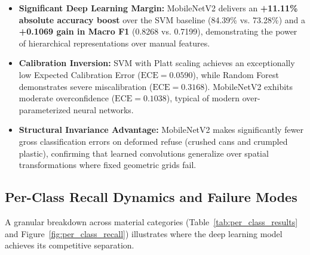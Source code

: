 \documentclass[11pt,a4paper]{article}
\begin{document}
\begin{tcolorbox}[title=Main observations]
\begin{itemize}[leftmargin=*]
    \item \textbf{Significant Deep Learning Margin:} MobileNetV2 delivers an \textbf{+11.11\% absolute accuracy boost} over the SVM baseline (84.39\% vs. 73.28\%) and a \textbf{+0.1069 gain in Macro F1} (0.8268 vs. 0.7199), demonstrating the power of hierarchical representations over manual features.
    \item \textbf{Calibration Inversion:} SVM with Platt scaling achieves an exceptionally low Expected Calibration Error ($\text{ECE} = 0.0590$), while Random Forest demonstrates severe miscalibration ($\text{ECE} = 0.3168$). MobileNetV2 exhibits moderate overconfidence ($\text{ECE} = 0.1038$), typical of modern over-parameterized neural networks.
    \item \textbf{Structural Invariance Advantage:} MobileNetV2 makes significantly fewer gross classification errors on deformed refuse (crushed cans and crumpled plastic), confirming that learned convolutions generalize over spatial transformations where fixed geometric grids fail.
\end{itemize}
\end{tcolorbox}

\subsection{Per-Class Recall Dynamics and Failure Modes}
A granular breakdown across material categories (Table~\ref{tab:per_class_results} and Figure~\ref{fig:per_class_recall}) illustrates where the deep learning model achieves its competitive separation.
\end{document}
